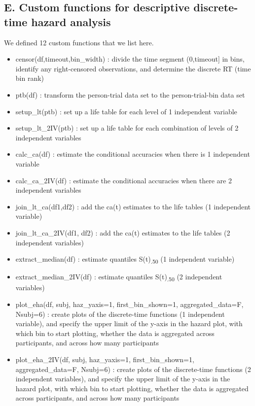 \documentclass[
  english,
  man,floatsintext]{apa6}
\providecommand{\tightlist}{%
  \setlength{\itemsep}{0pt}\setlength{\parskip}{0pt}}
\begin{document}
\subsection{E. Custom functions for descriptive discrete-time hazard analysis}\label{e.-custom-functions-for-descriptive-discrete-time-hazard-analysis}

We defined 12 custom functions that we list here.

\begin{itemize}
\tightlist
\item
  censor(df,timeout,bin\_width) : divide the time segment (0,timeout{]} in bins, identify any right-censored observations, and determine the discrete RT (time bin rank)
\item
  ptb(df) : transform the person-trial data set to the person-trial-bin data set
\item
  setup\_lt(ptb) : set up a life table for each level of 1 independent variable
\item
  setup\_lt\_2IV(ptb) : set up a life table for each combination of levels of 2 independent variables
\item
  calc\_ca(df) : estimate the conditional accuracies when there is 1 independent variable
\item
  calc\_ca\_2IV(df) : estimate the conditional accuracies when there are 2 independent variables
\item
  join\_lt\_ca(df1,df2) : add the ca(t) estimates to the life tables (1 independent variable)
\item
  join\_lt\_ca\_2IV(df1, df2) : add the ca(t) estimates to the life tables (2 independent variables)
\item
  extract\_median(df) : estimate quantiles S(t)\textsubscript{.50} (1 independent variable)
\item
  extract\_median\_2IV(df) : estimate quantiles S(t)\textsubscript{.50} (2 independent variables)
\item
  plot\_eha(df, subj, haz\_yaxis=1, first\_bin\_shown=1, aggregated\_data=F, Nsubj=6) : create plots of the discrete-time functions (1 independent variable), and specify the upper limit of the y-axis in the hazard plot, with which bin to start plotting, whether the data is aggregated across participants, and across how many participants
\item
  plot\_eha\_2IV(df, subj, haz\_yaxis=1, first\_bin\_shown=1, aggregated\_data=F, Nsubj=6) : create plots of the discrete-time functions (2 independent variables), and specify the upper limit of the y-axis in the hazard plot, with which bin to start plotting, whether the data is aggregated across participants, and across how many participants
\end{itemize}
\end{document}
